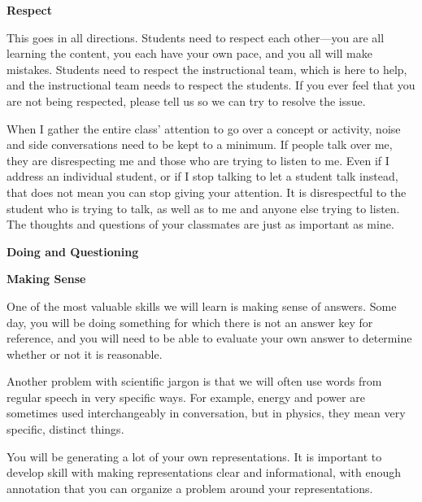 \documentclass[]{article}
\begin{document}
\begin{TeacherMargin}
\noindent\textbf{Respect}

This goes in all directions. Students need to respect each other---you are all learning the content, you each have your own pace, and you all will make mistakes. Students need to respect the instructional team, which is here to help, and the instructional team needs to respect the students. If you ever feel that you are not being respected, please tell us so we can try to resolve the issue.

When I gather the entire class' attention to go over a concept or activity, noise and side conversations need to be kept to a minimum. If people talk over me, they are disrespecting me and those who are trying to listen to me. Even if I address an individual student, or if I stop talking to let a student talk instead, that does not mean you can stop giving your attention. It is disrespectful to the student who is trying to talk, as well as to me and anyone else trying to listen. The thoughts and questions of your classmates are just as important as mine.

\noindent\textbf{Doing and Questioning}



\noindent\textbf{Making Sense}

One of the most valuable skills we will learn is making sense of answers. Some day, you will be doing something for which there is not an answer key for reference, and you will need to be able to evaluate your own answer to determine whether or not it is reasonable.

Another problem with scientific jargon is that we will often use words from regular speech in very specific ways. For example, energy and power are sometimes used interchangeably in conversation, but in physics, they mean very specific, distinct things.

You will be generating a lot of your own representations. It is important to develop skill with making representations clear and informational, with enough annotation that you can organize a problem around your representations.
\end{TeacherMargin}
\end{document}
